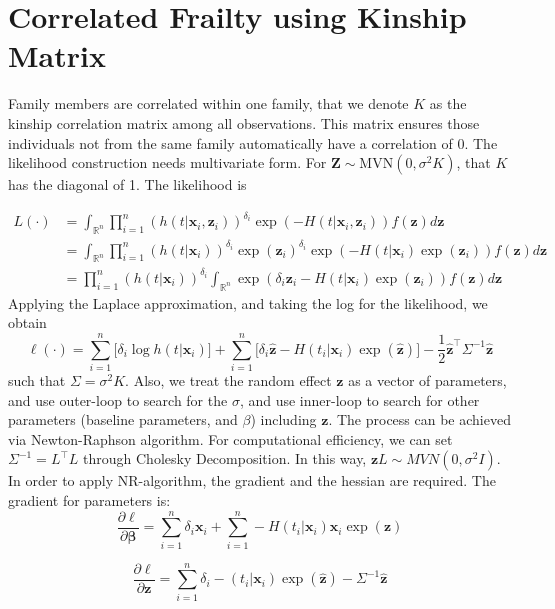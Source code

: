 \documentclass[preprint,12pt]{elsarticle}
\begin{document}
\section{Correlated Frailty using Kinship Matrix}
Family members are correlated within one family, that we denote $K$ as the kinship correlation matrix among all observations. This matrix ensures those individuals not from the same family automatically have a correlation of 0. The likelihood construction needs multivariate form. For $\mathbf{Z}\sim\text{MVN}(0,\sigma^2K)$, that $K$ has the diagonal of 1. The likelihood is 

\begin{align}
    L(\cdot)&=\int_{\mathbb{R}^n}\prod_{i=1}^n(h(t|\mathbf{x}_i, \mathbf{z}_i))^{\delta_i}\exp (-H(t|\mathbf{x}_i, \mathbf{z}_i))f(\mathbf{z})d\mathbf{z}\\
    &=\int_{\mathbb{R}^n}\prod_{i=1}^n(h(t|\mathbf{x}_i))^{\delta_i}\exp(\mathbf{z}_i)^{\delta_i}\exp(-H(t|\mathbf{x}_i)\exp(\mathbf{z}_i))f(\mathbf{z})d\mathbf{z}\\
    &=\prod_{i=1}^n(h(t|\mathbf{x}_i))^{\delta_i}\int_{\mathbb{R}^n}\exp(\delta_i\mathbf{z}_i-H(t|\mathbf{x}_i)\exp(\mathbf{z}_i))f(\mathbf{z})d\mathbf{z}
\end{align}
Applying the Laplace approximation, and taking the log for the likelihood, we obtain
\begin{equation}
    \ell(\cdot)=\sum_{i=1}^n\Big [ \delta_i\log h(t|\mathbf{x}_i)\Big ] + \sum_{i=1}^n\Big [\delta_i \hat{\mathbf{z}}-H(t_i|\mathbf{x}_i)\exp(\hat{\mathbf{z}})\Big ] - \frac{1}{2}\hat{\mathbf{z}}^{\top}\Sigma^{-1}\hat{\mathbf{z}}
\end{equation}
such that $\Sigma=\sigma^2 K$. Also, we treat the random effect $\mathbf{z}$ as a vector of parameters, and use outer-loop to search for the $\sigma$, and use inner-loop to search for other parameters (baseline parameters, and $\beta$) including $\mathbf{z}$. The process can be achieved via Newton-Raphson algorithm. For computational efficiency, we can set $\Sigma^{-1}=L^{\top}L$ through Cholesky Decomposition. In this way, 
$\mathbf{z}L\sim MVN(0,\sigma^2 I)$. In order to apply NR-algorithm, the gradient and the hessian are required. The gradient for parameters is:
\begin{equation}
    \frac{\partial\ell}{\partial\boldsymbol{\beta}}=\sum_{i=1}^n\delta_i\mathbf{x}_i+\sum_{i=1}^n-H(t_i|\mathbf{x}_i)\mathbf{x}_i\exp(\mathbf{z})
\end{equation}

\begin{equation}
    \frac{\partial\ell}{\partial\mathbf{z}}=\sum_{i=1}^n\delta_i-(t_i|\mathbf{x}_i)\exp(\hat{\mathbf{z}})-\Sigma^{-1}\hat{\mathbf{z}}
\end{equation}
\end{document}
